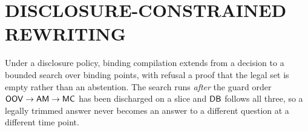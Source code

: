 %

\section{DISCLOSURE-CONSTRAINED REWRITING}
\label{sec:rewrite}

\noindent{} Under a disclosure policy, binding compilation extends from a decision
to a bounded search over binding points, with refusal a proof that the legal set
is empty rather than an abstention. The search runs \emph{after} the guard order
$\mathsf{OOV}\rightarrow\mathsf{AM}\rightarrow\mathsf{MC}$ has been discharged on a slice and $\mathsf{DB}$
follows all three, so a legally trimmed answer never becomes an answer to a
different question at a different time point.

